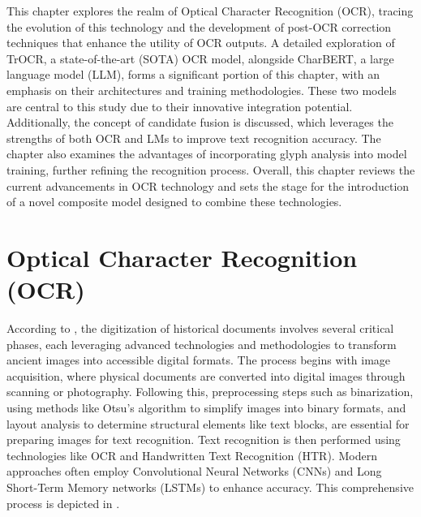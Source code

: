 \label{chap:2_related_work}
This chapter explores the realm of Optical Character Recognition (OCR), tracing the evolution of this technology and the development of post-OCR correction techniques that enhance the utility of OCR outputs. A detailed exploration of TrOCR, a state-of-the-art (SOTA) OCR model, alongside CharBERT, a large language model (LLM), forms a significant portion of this chapter, with an emphasis on their architectures and training methodologies. These two models are central to this study due to their innovative integration potential. Additionally, the concept of candidate fusion is discussed, which leverages the strengths of both OCR and LMs to improve text recognition accuracy. The chapter also examines the advantages of incorporating glyph analysis into model training, further refining the recognition process. Overall, this chapter reviews the current advancements in OCR technology and sets the stage for the introduction of a novel composite model designed to combine these technologies.

\section{Optical Character Recognition (OCR)}
\label{sec:2_ocr}
According to \cite{philips2020historical}, the digitization of historical documents involves several critical phases, each leveraging advanced technologies and methodologies to transform ancient images into accessible digital formats. The process begins with image acquisition, where physical documents are converted into digital images through scanning or photography. Following this, preprocessing steps such as binarization, using methods like Otsu’s algorithm \citep{liu2009otsu} to simplify images into binary formats, and layout analysis to determine structural elements like text blocks, are essential for preparing images for text recognition. Text recognition is then performed using technologies like OCR and Handwritten Text Recognition (HTR). Modern approaches often employ Convolutional Neural Networks (CNNs) \citep{zhang2017cnn} and Long Short-Term Memory networks (LSTMs) \citep{breuel2013high} to enhance accuracy. This comprehensive process is depicted in .


